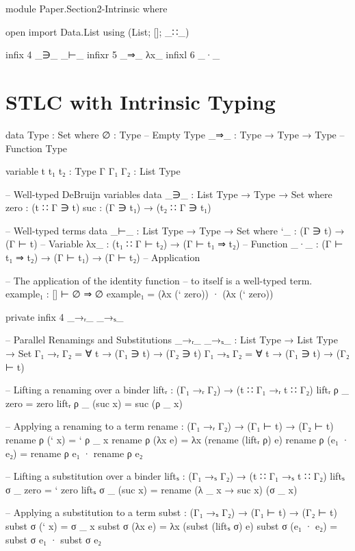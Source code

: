 \begin{code}[hide]
module Paper.Section2-Intrinsic where

open import Data.List using (List; []; _∷_)

infix  4  _∋_  _⊢_
infixr 5  _⇒_  λx_
infixl 6  _·_
\end{code}

\newpage
\section{STLC with Intrinsic Typing}

\begin{code}
data Type : Set where
  ∅    : Type                -- Empty Type
  _⇒_  : Type → Type → Type  -- Function Type

variable
  t t₁ t₂  : Type
  Γ Γ₁ Γ₂  : List Type

-- Well-typed DeBruijn variables
data _∋_ : List Type → Type → Set where
  zero  : (t ∷ Γ ∋ t)
  suc   : (Γ ∋ t₁) → (t₂ ∷ Γ ∋ t₁)

-- Well-typed terms
data _⊢_ : List Type → Type → Set where
  `_   : (Γ ∋ t) → (Γ ⊢ t)                    -- Variable
  λx_  : (t₁ ∷ Γ ⊢ t₂) → (Γ ⊢ t₁ ⇒ t₂)        -- Function
  _·_  : (Γ ⊢ t₁ ⇒ t₂) → (Γ ⊢ t₁) → (Γ ⊢ t₂)  -- Application
\end{code}
%
\begin{code}[hide]
-- The application of the identity function
-- to itself is a well-typed term.
example₁ : [] ⊢ ∅ ⇒ ∅
example₁ = (λx (` zero)) · (λx (` zero))

private
  infix  4  _→ᵣ_  _→ₛ_
\end{code}
%
\begin{code}
  -- Parallel Renamings and Substitutions
  _→ᵣ_ _→ₛ_ : List Type → List Type → Set
  Γ₁ →ᵣ Γ₂ = ∀ t → (Γ₁ ∋ t) → (Γ₂ ∋ t)
  Γ₁ →ₛ Γ₂ = ∀ t → (Γ₁ ∋ t) → (Γ₂ ⊢ t)

  -- Lifting a renaming over a binder
  liftᵣ : (Γ₁ →ᵣ Γ₂) → (t ∷ Γ₁ →ᵣ t ∷ Γ₂)
  liftᵣ ρ _ zero     = zero
  liftᵣ ρ _ (suc x)  = suc (ρ _ x)

  -- Applying a renaming to a term
  rename : (Γ₁ →ᵣ Γ₂) → (Γ₁ ⊢ t) → (Γ₂ ⊢ t)
  rename ρ (` x)      = ` ρ _ x
  rename ρ (λx e)     = λx (rename (liftᵣ ρ) e)
  rename ρ (e₁ · e₂)  = rename ρ e₁ · rename ρ e₂

  -- Lifting a substitution over a binder
  liftₛ : (Γ₁ →ₛ Γ₂) → (t ∷ Γ₁ →ₛ t ∷ Γ₂)
  liftₛ σ _ zero     = ` zero
  liftₛ σ _ (suc x)  = rename (λ _ x → suc x) (σ _ x)

  -- Applying a substitution to a term
  subst : (Γ₁ →ₛ Γ₂) → (Γ₁ ⊢ t) → (Γ₂ ⊢ t)
  subst σ (` x)      = σ _ x
  subst σ (λx e)     = λx (subst (liftₛ σ) e)
  subst σ (e₁ · e₂)  = subst σ e₁ · subst σ e₂
\end{code}
